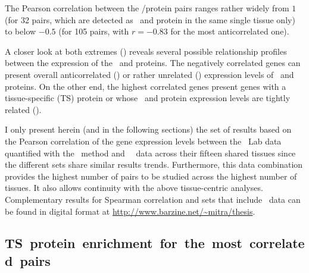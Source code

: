 The Pearson correlation between the \mRNA/protein pairs ranges rather widely
from $1$ (for 32 pairs,
which are detected as \mRNA\ and protein in the same single tissue only)
to below $-0.5$ (for 105 pairs,
with $r=-0.83$ for the  most anticorrelated one).\mybr\

A closer look at both extremes ()
reveals several possible relationship profiles
between the expression of the \mRNAs\ and proteins.
The negatively correlated genes can present
overall anticorrelated ()
or rather unrelated () expression levels
of \mRNAs\ and proteins.
On the other end,
the highest correlated genes present genes
with a tissue-specific (\gls{TS}) protein or
whose \mRNA\ and protein expression levels are tightly related
().\mybr\

\vspace{-4mm}
I only present herein (and in the following sections)
the set of results based on the Pearson correlation of the gene expression levels
between the \pandey\ Lab data quantified with the \PPKM\ method
and \uhlen\ \etal\ data across their fifteen shared tissues
since the different sets share similar results trends.
Furthermore, this data combination provides the highest number of pairs
to be studied across the highest number of tissues.
It also allows continuity with the above tissue-centric analyses.
Complementary results
for Spearman correlation and sets that include \gtex\ data can be found
in digital format at \url{http://www.barzine.net/~mitra/thesis}.\mybr\


\subsection{TS~protein~enrichment~for~the~most~correlated~pairs}
\vspace{-5mm}

